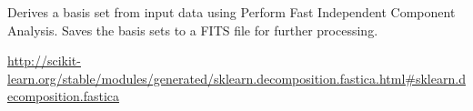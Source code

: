 \documentclass[a4paper,11pt,english]{sphinxmanual}
\begin{document}
\begin{fulllineitems}
\label{analysis:analysis.PSFbasisSets.deriveBasisSetsICA}
Derives a basis set from input data using Perform Fast Independent Component Analysis.
Saves the basis sets to a FITS file for further processing.

\href{http://scikit-learn.org/stable/modules/generated/sklearn.decomposition.fastica.html\#sklearn.decomposition.fastica}{http://scikit-learn.org/stable/modules/generated/sklearn.decomposition.fastica.html\#sklearn.decomposition.fastica}

\end{fulllineitems}

\end{document}
